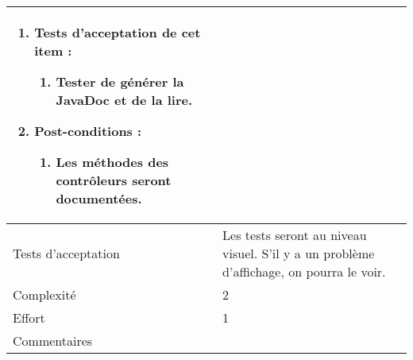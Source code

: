 \begin{longtable}{|l|p{}|}
\begin{enumerate}[label*=\arabic*.]
\begin{enumerate}[label*=\arabic*.]
\begin{enumerate}[label*=\arabic*.]
                                \end{enumerate}
                                \item Tests d'acceptation de cet item :
                                \begin{enumerate}[label*=\arabic*.]
                                    \item Tester de générer la JavaDoc et de la lire.
                                \end{enumerate}
                                \item Post-conditions :
                                \begin{enumerate}[label*=\arabic*.]
                                    \item Les méthodes des contrôleurs seront documentées.
                                \end{enumerate}
                            \end{enumerate}
        \end{enumerate} \\
\hline
    Tests d'acceptation & Les tests seront au niveau visuel. S'il y a un problème d'affichage, on pourra le voir. \\
\hline
    Complexité & 2 \\
\hline
    Effort & 1 \\
\hline
    Commentaires &  \\


\end{longtable}
